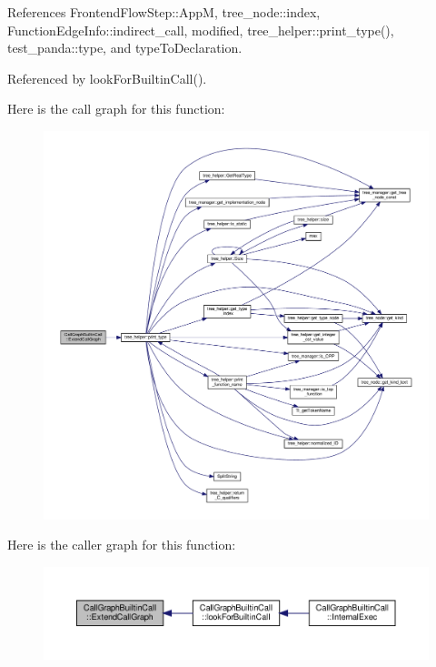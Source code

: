 References Frontend\+Flow\+Step\+::\+AppM, tree\+\_\+node\+::index, Function\+Edge\+Info\+::indirect\+\_\+call, modified, tree\+\_\+helper\+::print\+\_\+type(), test\+\_\+panda\+::type, and type\+To\+Declaration.



Referenced by look\+For\+Builtin\+Call().

Here is the call graph for this function\+:
\nopagebreak
\begin{figure}[H]
\begin{center}
\leavevmode
\includegraphics[width=350pt]{d6/da0/classCallGraphBuiltinCall_a454e14be35421e6dcc70c06ae958d588_cgraph}
\end{center}
\end{figure}
Here is the caller graph for this function\+:
\nopagebreak
\begin{figure}[H]
\begin{center}
\leavevmode
\includegraphics[width=350pt]{d6/da0/classCallGraphBuiltinCall_a454e14be35421e6dcc70c06ae958d588_icgraph}
\end{center}
\end{figure}
\mbox{\label{classCallGraphBuiltinCall_a8f754ae1d4aa2a9857d2288768902852}} 
